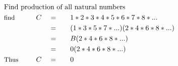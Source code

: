 \begin{alignat*}{5}
&\rlap{\text{Find production of all natural numbers}}\\
&\small\text{find}\normalsize\qquad&C\quad&=\quad&&1*2*3*4*5*6*7*8*...\\
&\,&\,&=&&(1*3*5*7*...)(2*4*6*8*...)\\
&\,&\,&=&&B(2*4*6*8*...)\\
&\,&\,&=&&0(2*4*6*8*...)\\
&\small\text{Thus}&C\quad&=&&0
\end{alignat*}
